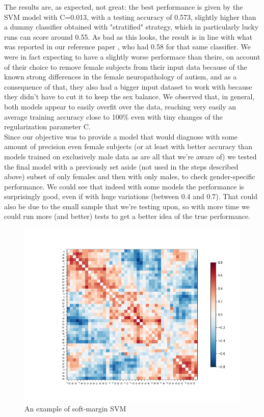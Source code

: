 \documentclass{article}
\begin{document}
The results are, as expected, not great: the best performance is given by the SVM model with C=0.013, with a testing accuracy of 0.573, slightly higher than a dummy classifier obtained with "stratified" strategy, which in particularly lucky runs can score around 0.55. As bad as this looks, the result is in line with what was reported in our reference paper \cite{guidelinesml}, who had 0.58 for that same classifier. We were in fact expecting to have a slightly worse performace than theirs, on account of their choice to remove female subjects from their input data because of the known strong differences in the female neuropathology of autism, and as a consequence of that, they also had a bigger input dataset to work with because they didn't have to cut it to keep the sex balance.
We observed that, in general, both models appear to easily overfit over the data, reaching very easily an average training accuracy close to 100\% even with tiny changes of the regularization parameter C.\\

Since our objective was to provide a model that would diagnose with some amount of precision even female subjects (or at least with better accuracy than models trained on exclusively male data as are all that we're aware of) we tested the final model with a previously set aside (not used in the steps described above) subset of only females and then with only males, to check gender-specific performance. We could see that indeed with some models the performance is surprisingly good, even if with huge variations (between 0.4 and 0.7). That could also be due to the small sample that we're testing upon, so with more time we could run more (and better) tests to get a better idea of the true performance.
\begin{figure}[h]
	\centering
	\includegraphics{img/corr_matrix}
	\caption{An example of soft-margin SVM}
\end{figure}
\end{document}
